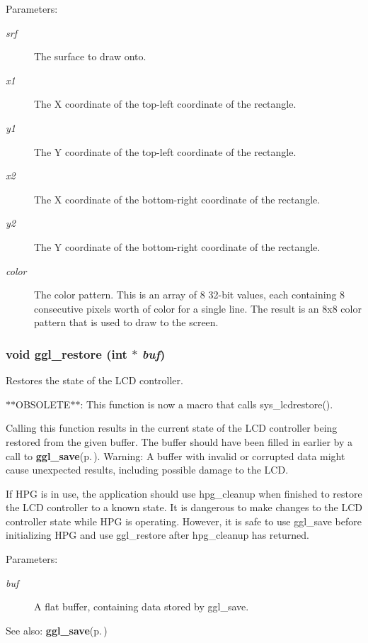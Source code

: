 \begin{Desc}
\item[Parameters:]
\begin{description}
\item[{\em srf}]The surface to draw onto. \item[{\em x1}]The X coordinate of the top-left coordinate of the rectangle. \item[{\em y1}]The Y coordinate of the top-left coordinate of the rectangle. \item[{\em x2}]The X coordinate of the bottom-right coordinate of the rectangle. \item[{\em y2}]The Y coordinate of the bottom-right coordinate of the rectangle. \item[{\em color}]The color pattern. This is an array of 8 32-bit values, each containing 8 consecutive pixels worth of color for a single line. The result is an 8x8 color pattern that is used to draw to the screen. \end{description}
\end{Desc}
\subsubsection{\setlength{\rightskip}{0pt plus 5cm}void ggl\_\-restore (int $\ast$ {\em buf})}\label{ggl_8h_a11}


Restores the state of the LCD controller. 

$\ast$$\ast$OBSOLETE$\ast$$\ast$: This function is now a macro that calls sys\_\-lcdrestore().

Calling this function results in the current state of the LCD controller being restored from the given buffer. The buffer should have been filled in earlier by a call to {\bf ggl\_\-save}{\rm (p.\,\pageref{ggl_8h_a5})}. Warning: A buffer with invalid or corrupted data might cause unexpected results, including possible damage to the LCD.

If HPG is in use, the application should use hpg\_\-cleanup when finished to restore the LCD controller to a known state. It is dangerous to make changes to the LCD controller state while HPG is operating. However, it is safe to use ggl\_\-save before initializing HPG and use ggl\_\-restore after hpg\_\-cleanup has returned.

\begin{Desc}
\item[Parameters:]
\begin{description}
\item[{\em buf}]A flat buffer, containing data stored by ggl\_\-save. \end{description}
\end{Desc}
\begin{Desc}
\item[See also:]{\bf ggl\_\-save}{\rm (p.\,\pageref{ggl_8h_a5})} \end{Desc}
